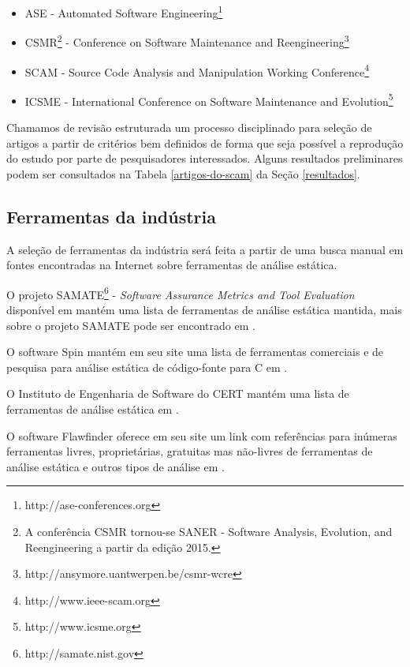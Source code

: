 \documentclass[qual, classic, a4paper]{ufbathesis}
\begin{document}
\begin{itemize}
  \item ASE - Automated Software
    Engineering\footnote{http://ase-conferences.org}
  \item CSMR\footnote{A conferência CSMR tornou-se SANER - Software Analysis,
    Evolution, and Reengineering a partir da edição 2015.} - Conference on
    Software Maintenance and
    Reengineering\footnote{http://ansymore.uantwerpen.be/csmr-wcre}
  \item SCAM - Source Code Analysis and Manipulation Working
    Conference\footnote{http://www.ieee-scam.org}
  \item ICSME - International Conference on Software Maintenance and
    Evolution\footnote{http://www.icsme.org}
\end{itemize}

Chamamos de revisão estruturada um processo disciplinado para seleção de
artigos a partir de critérios bem definidos de forma que seja possível a
reprodução do estudo por parte de pesquisadores interessados. Alguns
resultados preliminares podem ser consultados na Tabela \ref{artigos-do-scam}
da Seção \ref{resultados}.

\subsection{Ferramentas da indústria}

A seleção de ferramentas da indústria será feita a partir de uma busca manual
em fontes encontradas na Internet sobre ferramentas de análise estática.

O projeto SAMATE\footnote{
http://samate.nist.gov} - {\em Software Assurance Metrics and Tool Evaluation}
disponível em  mantém uma lista de
ferramentas de análise estática mantida, mais sobre o projeto SAMATE pode
ser encontrado em .

O software Spin mantém em seu site uma lista de ferramentas comerciais e de
pesquisa para análise estática de código-fonte para C em
.

O Instituto de Engenharia de Software do CERT mantém uma lista de ferramentas
de análise estática em .

O software Flawfinder oferece em seu site um link com referências para
inúmeras ferramentas livres, proprietárias, gratuitas mas não-livres de
ferramentas de análise estática e outros tipos de análise em
.
\end{document}
